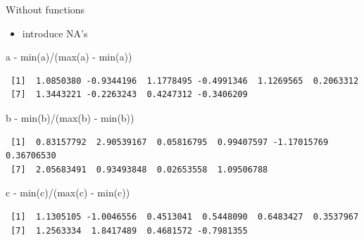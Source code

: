 \documentclass[
  ignorenonframetext,
]{beamer}
\newenvironment{Shaded}{\begin{snugshade}}{\end{snugshade}}
\newcommand{\FunctionTok}[1]{\textcolor[rgb]{0.28,0.35,0.67}{#1}}
\newcommand{\NormalTok}[1]{\textcolor[rgb]{0.00,0.23,0.31}{#1}}
\newcommand{\SpecialCharTok}[1]{\textcolor[rgb]{0.37,0.37,0.37}{#1}}
\providecommand{\tightlist}{%
  \setlength{\itemsep}{0pt}\setlength{\parskip}{0pt}}\usepackage{longtable,booktabs,array}
\begin{document}
\begin{frame}[fragile]
\begin{block}{Without functions}
\protect\hypertarget{without-functions}{}
\begin{itemize}
\tightlist
\item
  introduce NA's
\end{itemize}

\begin{Shaded}
\begin{Highlighting}[]
\NormalTok{a }\SpecialCharTok{{-}} \FunctionTok{min}\NormalTok{(a)}\SpecialCharTok{/}\NormalTok{(}\FunctionTok{max}\NormalTok{(a) }\SpecialCharTok{{-}} \FunctionTok{min}\NormalTok{(a))}
\end{Highlighting}
\end{Shaded}

\begin{verbatim}
 [1]  1.0850380 -0.9344196  1.1778495 -0.4991346  1.1269565  0.2063312
 [7]  1.3443221 -0.2263243  0.4247312 -0.3406209
\end{verbatim}

\begin{Shaded}
\begin{Highlighting}[]
\NormalTok{b }\SpecialCharTok{{-}} \FunctionTok{min}\NormalTok{(b)}\SpecialCharTok{/}\NormalTok{(}\FunctionTok{max}\NormalTok{(b) }\SpecialCharTok{{-}} \FunctionTok{min}\NormalTok{(b))}
\end{Highlighting}
\end{Shaded}

\begin{verbatim}
 [1]  0.83157792  2.90539167  0.05816795  0.99407597 -1.17015769  0.36706530
 [7]  2.05683491  0.93493848  0.02653558  1.09506788
\end{verbatim}

\begin{Shaded}
\begin{Highlighting}[]
\NormalTok{c }\SpecialCharTok{{-}} \FunctionTok{min}\NormalTok{(c)}\SpecialCharTok{/}\NormalTok{(}\FunctionTok{max}\NormalTok{(c) }\SpecialCharTok{{-}} \FunctionTok{min}\NormalTok{(c))}
\end{Highlighting}
\end{Shaded}

\begin{verbatim}
 [1]  1.1305105 -1.0046556  0.4513041  0.5448090  0.6483427  0.3537967
 [7]  1.2563334  1.8417489  0.4681572 -0.7981355
\end{verbatim}


\end{block}
\end{frame}
\end{document}

